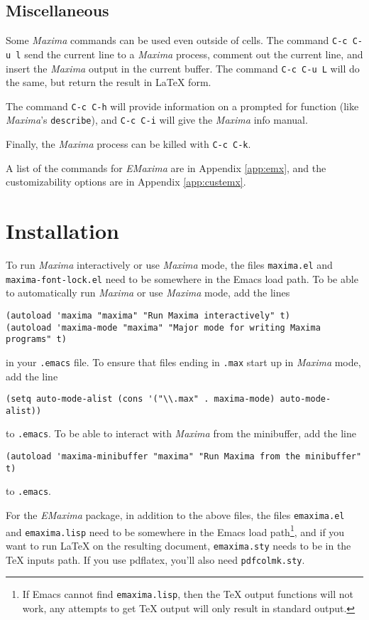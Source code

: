 \documentclass{article}
\newcommand{\emx}{\textsl{\sffamily EMaxima}}
\newcommand{\mx}{\textsl{\sffamily Maxima}}
\begin{document}
\subsection{Miscellaneous}

\noindent
Some \mx{} commands can be used even outside of cells.  The command 
\texttt{C-c C-u l} send the current line to a
\mx{} process, comment out the current line, and insert the \mx{}
output in the current buffer.  The command 
\texttt{C-c C-u L} will do the same, but
return the result in \LaTeX{} form.

The command \texttt{C-c C-h} will provide
information on a prompted for function (like \mx's \texttt{describe}), 
and  \texttt{C-c C-i} will give the \mx{} info manual.

Finally, the \mx{} process can be killed with \texttt{C-c C-k}.

A list of the commands for \emx{} are in Appendix \ref{app:emx}, and
the customizability options are in Appendix \ref{app:custemx}.

\newpage
\appendix

\section{Installation}

To run \mx{} interactively or use \mx{} mode, the files
\texttt{maxima.el} and \texttt{maxima-font-lock.el} need to be
somewhere in the Emacs load path.  To be able to automatically run
\mx{} or use \mx{} mode, add the lines\\
\begin{verbatim}
(autoload 'maxima "maxima" "Run Maxima interactively" t)
(autoload 'maxima-mode "maxima" "Major mode for writing Maxima programs" t)
\end{verbatim}
\noindent
in your \texttt{.emacs} file.  
To ensure that files ending in \texttt{.max} start up in \mx{} mode,
add the line
\begin{verbatim}
(setq auto-mode-alist (cons '("\\.max" . maxima-mode) auto-mode-alist))
\end{verbatim}
to \texttt{.emacs}.  To be able to interact with \mx{} from the
minibuffer, add the line
\begin{verbatim}
(autoload 'maxima-minibuffer "maxima" "Run Maxima from the minibuffer" t)
\end{verbatim}
\noindent
to \texttt{.emacs}.

For the \emx{} package, in addition to the above files, the files
\texttt{emaxima.el} and \texttt{emaxima.lisp} need to be somewhere in
the Emacs load path\footnote{If Emacs cannot find
  \texttt{emaxima.lisp}, then the \TeX{} output functions will not
  work, any attempts to get \TeX{} output will only result in standard
  output.}, and if you want to run \LaTeX{} on the resulting document,
\texttt{emaxima.sty} needs to be in the \TeX{} inputs path.  If you
use pdflatex, you'll also need \texttt{pdfcolmk.sty}.
\end{document}
